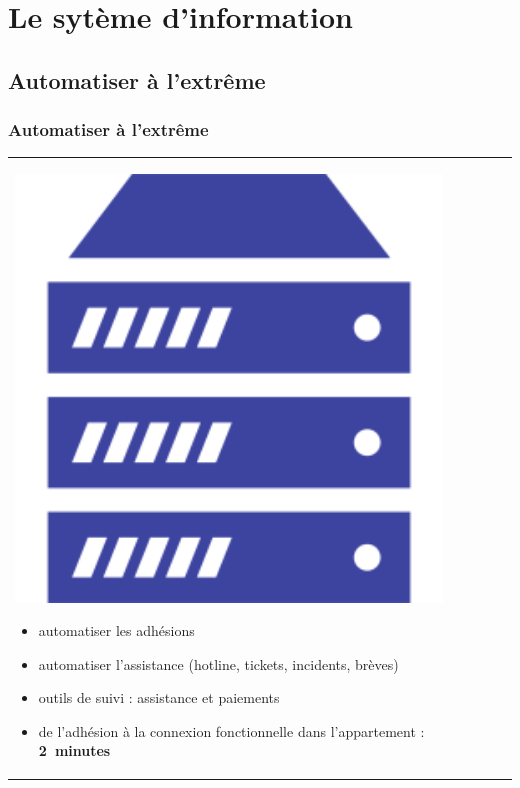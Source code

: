 \documentclass[handout]{beamer}
\begin{document}
	\section{Le sytème d'information}

	\subsection{Automatiser à l'extrême}
		\begin{frame}
		\frametitle{Automatiser à l'extrême}
		\begin{tabular}{l l}
			\begin{minipage}{0.2\textwidth}
				\begin{center}
					\includegraphics[width=0.9\textwidth]{images/serveur.png}
				\end{center}
			\end{minipage}

			\begin{minipage}{0.8\textwidth}
				\begin{itemize}
					\item automatiser les adhésions
					\item automatiser l'assistance (hotline, tickets, incidents, brèves)
					\item outils de suivi : assistance et paiements
					\item de l'adhésion à la connexion fonctionnelle dans l'appartement : \mbox{\textbf{2 minutes}}
				\end{itemize}
			\end{minipage}
			
		\end{tabular}
		\end{frame}
\end{document}
